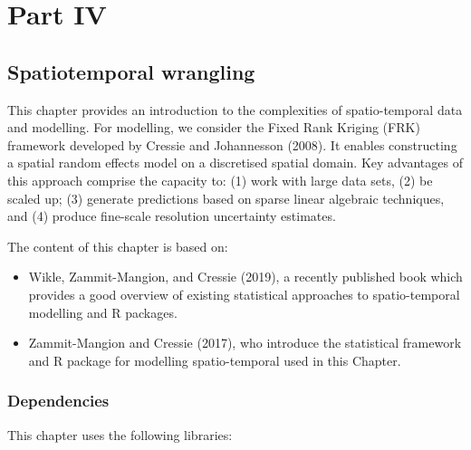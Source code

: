 \documentclass[
  letterpaper,
  krantz2]{style/krantz}
\begin{document}
\part{Part IV}

\hypertarget{spatiotemporal-wrangling}{%
\chapter{Spatiotemporal wrangling}\label{spatiotemporal-wrangling}}

This chapter provides an introduction to the complexities of
spatio-temporal data and modelling. For modelling, we consider the Fixed
Rank Kriging (FRK) framework developed by Cressie and Johannesson
(2008). It enables constructing a spatial random effects model on a
discretised spatial domain. Key advantages of this approach comprise the
capacity to: (1) work with large data sets, (2) be scaled up; (3)
generate predictions based on sparse linear algebraic techniques, and
(4) produce fine-scale resolution uncertainty estimates.

The content of this chapter is based on:

\begin{itemize}
\item
  Wikle, Zammit-Mangion, and Cressie (2019), a recently published book
  which provides a good overview of existing statistical approaches to
  spatio-temporal modelling and R packages.
\item
  Zammit-Mangion and Cressie (2017), who introduce the statistical
  framework and R package for modelling spatio-temporal used in this
  Chapter.
\end{itemize}

\hypertarget{dependencies-7}{%
\section{Dependencies}\label{dependencies-7}}

This chapter uses the following libraries:
\end{document}
